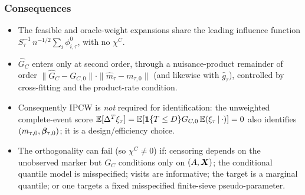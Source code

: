 \subsubsection{Consequences}
\begin{itemize}
\item The feasible and oracle-weight expansions share the leading influence
function $S_\tau^{-1}\,n^{-1/2}\sum_i\phi^0_{i,\tau}$, with no $\chi^C$.
\item $\widehat G_C$ enters only at second order, through a nuisance-product
remainder of order $\|\widehat G_C-G_{C,0}\|\cdot\|\widehat m_\tau-m_{\tau,0}\|$
(and likewise with $\widehat g_\tau$), controlled by cross-fitting and the
product-rate condition.
\item Consequently IPCW is \emph{not} required for identification: the unweighted
complete-event score $\mathbb{E}[\Delta^T\xi_\tau]=\mathbb{E}[\mathbf{1}\{T\le D\}G_{C,0}\,
\mathbb{E}(\xi_\tau\,\vert\,\cdot)]=0$ also identifies $(m_{\tau,0},\bm{\beta}_{\tau,0})$; it is
a design/efficiency choice.
\item The orthogonality can fail (so $\chi^C\neq0$) if: censoring depends on the
unobserved marker but $G_C$ conditions only on $(A,\bm{X})$; the conditional quantile
model is misspecified; visits are informative; the target is a marginal quantile;
or one targets a fixed misspecified finite-sieve pseudo-parameter.
\end{itemize}
